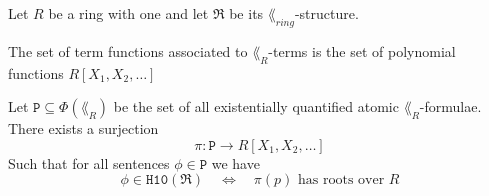 \begin{thm}\label{thm:Diophantine theory}
  Let \(R\) be a ring with one and let \(\mathfrak{R}\) be its
  \(\lang_{ring}\)-structure.
  \begin{thmlist}
    \item The set of term functions associated to \(\lang_R\)-terms is the set
    of polynomial functions \(R[X_1, X_2, …]\)

    \item Let \(\mathtt{P} \subseteq Φ(\lang_R)\) be the set of all
    existentially quantified atomic \(\lang_R\)-formulae. There exists a
    surjection
    \[
      π: \mathtt{P} → R[X_1, X_2, …]
    \]
    Such that for all sentences \(ϕ ∈ \mathtt{P}\) we have
    \[
      ϕ ∈ \mathtt{H10}(\mathfrak{R}) \quad ⇔ \quad
      π(p) \text{ has roots over } R
    \]
  \end{thmlist}
\end{thm}
